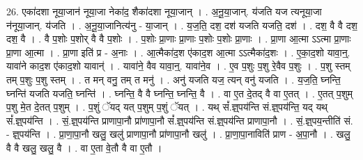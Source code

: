 \documentclass[17pt]{extarticle}
\begin{document}
26. एका॑दशा नूया॒जान॑ नूया॒जा नेका॑द॒ शैका॑दशा नूया॒जान् । . अ॒नू॒या॒जान्. य॑जति यज त्यनूया॒जा न॑नूया॒जान्. य॑जति । . अ॒नू॒या॒जानित्य॑नु - या॒जान् । . य॒ज॒ति॒ दश॒ दश॑ यजति यजति॒ दश॑ । . दश॒ वै वै दश॒ दश॒ वै । . वै प॒शोः प॒शोर् वै वै प॒शोः । . प॒शोः प्रा॒णाः प्रा॒णाः प॒शोः प॒शोः प्रा॒णाः । . प्रा॒णा आ॒त्मा ऽऽत्मा प्रा॒णाः प्रा॒णा आ॒त्मा । . प्रा॒णा इति॑ प्र - अ॒नाः । . आ॒त्मैका॑द॒श ए॑काद॒श आ॒त्मा ऽऽत्मैका॑द॒शः । . ए॒का॒द॒शो यावा॒न्॒. यावा॑ने काद॒श ए॑काद॒शो यावान्॑ । . यावा॑ने॒ वैव यावा॒न्॒. यावा॑ने॒व । . ए॒व प॒शुः प॒शु रे॒वैव प॒शुः । . प॒शु स्तम् तम् प॒शुः प॒शु स्तम् । . त मन् वनु॒ तम् त मनु॑ । . अनु॑ यजति यज॒ त्यन् वनु॑ यजति । . य॒ज॒ति॒ घ्नन्ति॒ घ्नन्ति॑ यजति यजति॒ घ्नन्ति॑ । . घ्नन्ति॒ वै वै घ्नन्ति॒ घ्नन्ति॒ वै । . वा ए॒त दे॒तद् वै वा ए॒तत् । . ए॒तत् प॒शुम् प॒शु मे॒त दे॒तत् प॒शुम् । . प॒शुं ॅयद् यत् प॒शुम् प॒शुं ॅयत् । . यथ् सं᳚.ज्ञ्॒पय॑न्ति सं.ज्ञ्॒पय॑न्ति॒ यद् यथ् सं᳚.ज्ञ्॒पय॑न्ति । . सं॒.ज्ञ्॒पय॑न्ति प्राणापा॒नौ प्रा॑णापा॒नौ सं᳚.ज्ञ्॒पय॑न्ति सं.ज्ञ्॒पय॑न्ति प्राणापा॒नौ । . सं॒.ज्ञ्॒पय॒न्तीति॑ सं. - ज्ञ्॒पय॑न्ति । . प्रा॒णा॒पा॒नौ खलु॒ खलु॑ प्राणापा॒नौ प्रा॑णापा॒नौ खलु॑ । . प्रा॒णा॒पा॒नाविति॑ प्राण - अ॒पा॒नौ । . खलु॒ वै वै खलु॒ खलु॒ वै । . वा ए॒ता वे॒तौ वै वा ए॒तौ । \newline
\end{document}
